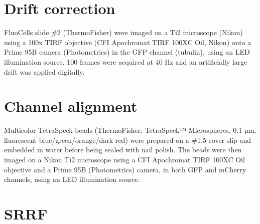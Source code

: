 

\onecolumn %
\fancyhead{} %
\renewcommand{\floatpagefraction}{0.1}
\lfoot[\bSupInf]{\dAuthor}
\rfoot[\dAuthor]{\cSupInf}
\newpage

\captionsetup*{format=largeformat} %
\setcounter{figure}{0} %
\setcounter{equation}{0} %
\setcounter{table}{0} %
\setcounter{page}{1} %
\makeatletter
\renewcommand{\thefigure}{S\@arabic\c@figure} %
\makeatother
\makeatletter
\renewcommand{\thetable}{S\@arabic\c@table} %
\makeatother
\makeatletter
\renewcommand{\theequation}{S\@arabic\c@equation} %
\makeatother




\tableofcontents

\newpage
\section{Drift correction}
FluoCells slide \#2 (ThermoFisher) were imaged on a Ti2 microscope (Nikon) using a 100x TIRF objective (CFI Apochromat TIRF 100XC Oil, Nikon) onto a Prime 95B camera (Photometrics) in the GFP channel (tubulin), using an LED illumination source. 100 frames were acquired at 40 Hz and an artificially large drift was applied digitally.


\section{Channel alignment}

Multicolor TetraSpeck beads (ThermoFisher, TetraSpeck™ Microspheres, 0.1 µm, fluorescent blue/green/orange/dark red) were prepared on a \#1.5 cover slip and embedded in water before being sealed with nail polish. The beads were then imaged on a Nikon Ti2 microscope using a CFI Apochromat TIRF 100XC Oil objective and a Prime 95B (Photometrics) camera, in both GFP and mCherry channels, using an LED illumination source. 

\section{SRRF}

